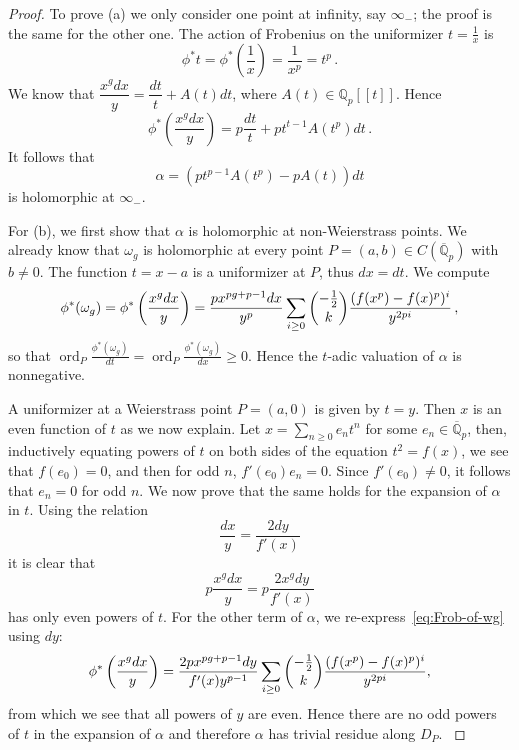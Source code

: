 \documentclass[10pt,a4paper]{amsart}
\newcommand{\Q}{\mathbb{Q}}
\newcommand{\ord}{\operatorname{ord}}
\newcommand{\sg}{{}}
\newcommand{\sm}{{}}
\begin{document}
\begin{proof}
To prove (a) we only consider one point at infinity, say $\infty_-$; the
  proof is the same for the other one. The action of Frobenius on the
  uniformizer $t=\frac{1}{x}$ is 
\[
\phi^* t=\phi^*\left(\dfrac{1}{x}\right)=\dfrac{1}{x^p}=t^p\,.
\]
We know that $\dfrac{x^gdx}{y}=\dfrac{dt}{t}+A(t) dt $, where $A(t)\in \Q_p[[t]]$.
Hence
\[
\phi^*\left(\dfrac{x^gdx}{y}\right)=p\dfrac{dt}{t}+pt^{t-1}A(t^p)dt\,.
\]
It follows that
\[
\alpha=(pt^{p-1}A(t^p)-pA(t))dt
\]
is holomorphic at $\infty_-$. 

For (b), we first show that $\alpha$ is holomorphic at non-Weierstrass
  points. We already know that \sg{$\omega_g$} is holomorphic at every point
  $P=(a,b)\in C(\overline{\Q}_p)$ with $b\neq 0$. The function $t=x-a$ is a uniformizer at $P$, thus $dx=dt$. We compute 
\begin{equation}\label{eq:Frob-of-wg}
 \sg{\phi^*(\omega_g)}=\phi^*\left(\dfrac{x^gdx}{y}\right)=\dfrac{px^{pg+p-1}dx}{y^p}\displaystyle\sum_{i\geq
  0}\dbinom{-\frac{1}{2}}{k}\dfrac{(f(x^p)-f(x)^p)^i}{y^{2pi}}\,,    
\end{equation}
so that  \sg{$\ord_P\frac{\phi^*(\omega_g)}{dt}=\ord_P\frac{\phi^*(\omega_g)}{dx}\geq 0$}.
Hence the $t$-adic valuation of $\alpha$ is nonnegative.

A uniformizer at a Weierstrass point $P=(a,0)$ is given by $t=y$. Then $x$ is an
  even function of $t$ as we now explain. Let $x=\sum_{n\geq 0} e_nt^n$ for
  some $e_n\in\overline{\Q}_p$, then, inductively equating powers of $t$ on
  both sides of the equation $t^2=f(x)$, we see that $f(e_0)=0$, and then for odd $n$, $f'(e_0)e_n=0$. Since $f'(e_0)\neq 0$, it follows that $e_n=0$ for odd $n$.
We now prove that the same holds for the expansion of $\alpha$ in $t$. Using the relation
$$\dfrac{dx}{y}=\dfrac{2dy}{f'(x)}$$
it is clear that 
$$p\dfrac{x^gdx}{y}=p\dfrac{2x^gdy}{f'(x)}$$
has only even powers of $t$. For the other term of $\alpha$, we
  re-express~\eqref{eq:Frob-of-wg} using $dy$:
$$\phi^*\left(\dfrac{x^gdx}{y}\right)=\dfrac{2px^{pg+p-1}dy}{f'(x)y^{p-1}}\displaystyle\sum_{i\geq 0}\dbinom{-\frac{1}{2}}{k}\dfrac{(f(x^p)-f(x)^p)^i}{y^{2pi}},$$
from which we see that all powers of $y$ are even. Hence there are no odd
  powers of $t$ in the expansion of $\alpha$ and therefore \sm{$\alpha$ has
  trivial residue along $D_P$. }
\end{proof}
\end{document}
